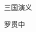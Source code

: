 \documentclass[10pt,openany]{book}
\begin{document}
\frontmatter

\begin{titlepage}
\centering
{\Huge 三国演义\par}
\vspace{1.5cm}
{\LARGE 罗贯中\par}
\vfill
\newpage %
\end{titlepage}

\pagestyle{tocstyle}
\tableofcontents %

\mainmatter
\pagestyle{mystyle}


\end{document}
